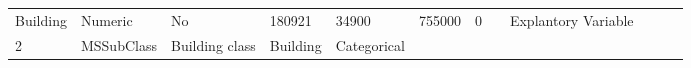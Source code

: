 \documentclass[11pt]{article}
\begin{document}
\begin{longtable}[]{@{}llllllllllll@{}}
\begin{minipage}[t]{0.04\columnwidth}
Building\strut
\end{minipage} & \begin{minipage}[t]{0.04\columnwidth}\raggedright\strut
Numeric\strut
\end{minipage} & \begin{minipage}[t]{0.04\columnwidth}\raggedright\strut
No\strut
\end{minipage} & \begin{minipage}[t]{0.04\columnwidth}\raggedright\strut
180921\strut
\end{minipage} & \begin{minipage}[t]{0.04\columnwidth}\raggedright\strut
34900\strut
\end{minipage} & \begin{minipage}[t]{0.04\columnwidth}\raggedright\strut
755000\strut
\end{minipage} & \begin{minipage}[t]{0.04\columnwidth}\raggedright\strut
0\strut
\end{minipage} & \begin{minipage}[t]{0.04\columnwidth}\raggedright\strut
\strut
\end{minipage} & \begin{minipage}[t]{0.04\columnwidth}\raggedright\strut
Explantory Variable\strut
\end{minipage}\tabularnewline
\begin{minipage}[t]{0.04\columnwidth}\raggedright\strut
2\strut
\end{minipage} & \begin{minipage}[t]{0.04\columnwidth}\raggedright\strut
MSSubClass\strut
\end{minipage} & \begin{minipage}[t]{0.04\columnwidth}\raggedright\strut
Building class\strut
\end{minipage} & \begin{minipage}[t]{0.04\columnwidth}\raggedright\strut
Building\strut
\end{minipage} & \begin{minipage}[t]{0.04\columnwidth}\raggedright\strut
Categorical\strut
\end{minipage} & \begin{minipage}[t]{0.04\columnwidth}\raggedright\strut
\strut
\end{minipage} & \begin{minipage}[t]{0.04\columnwidth}\raggedright\strut
\strut
\end{minipage} & \begin{minipage}[t]{0.04\columnwidth}\raggedright\strut

\end{minipage}
\end{longtable}
\end{document}
